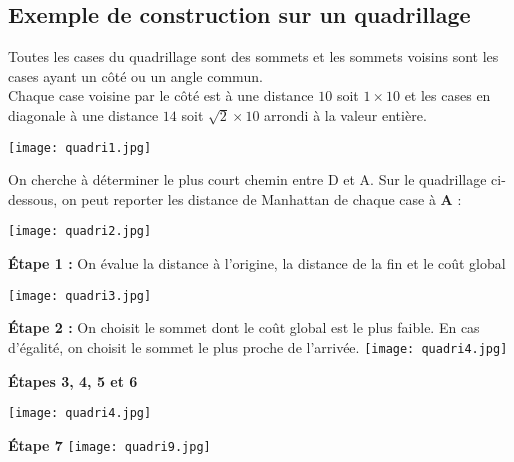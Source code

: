 \subsection{Exemple de construction sur un quadrillage}

\begin{minipage}[c]{.65\linewidth}
Toutes les cases du quadrillage sont des sommets et les sommets voisins sont les cases ayant un côté ou un angle commun.\\
Chaque case voisine par le côté est à une distance $10$ soit $1 \times 10$ et les cases en diagonale à une distance $14$ soit $\sqrt{2} \times 10$ arrondi à la valeur entière.\\
\end{minipage}
\hfill %
\begin{minipage}[c]{.35\linewidth}
\begin{center}
\texttt{[image: quadri1.jpg]}
\end{center}
\end{minipage}


On cherche à déterminer le plus court chemin entre D et A. Sur le quadrillage ci-dessous, on peut reporter les distance de Manhattan de chaque case à \textbf{A} : 

\begin{center}
\texttt{[image: quadri2.jpg]}
\end{center}

\begin{multicols}{2}

\begin{center}

\textbf{\'Etape 1 :} On évalue la distance à l'origine, la distance de la fin et le coût global \\
\vfill

\texttt{[image: quadri3.jpg]}
\end{center}
\begin{center}


\textbf{\'Etape 2 :} On choisit le sommet dont le coût global est le plus faible. En cas d'égalité, on choisit le sommet le plus proche de l'arrivée.
\texttt{[image: quadri4.jpg]}
\end{center}
\end{multicols}


\newpage

\begin{multicols}{2}

\begin{center}

\textbf{\'Etapes 3, 4, 5 et 6}

\texttt{[image: quadri4.jpg]}
\end{center}

\begin{center}
\textbf{\'Etape 7}
\texttt{[image: quadri9.jpg]}
\end{center}
\end{multicols}

